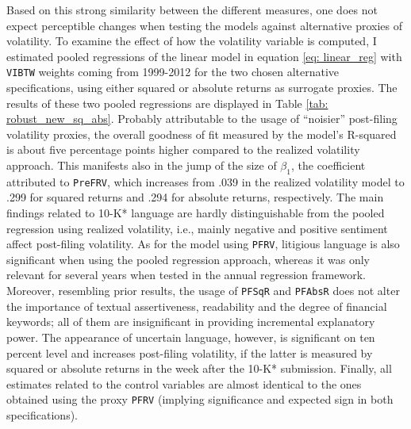 Based on this strong similarity between the different measures, one does not expect perceptible changes when testing the models against alternative proxies of volatility. To examine the effect of how the volatility variable is computed, I estimated pooled regressions of the linear model in equation \eqref{eq: linear_reg} with \texttt{VIBTW} weights coming from 1999-2012 for the two chosen alternative specifications, using either squared or absolute returns as surrogate proxies. The results of these two pooled regressions are displayed in Table \ref{tab: robust_new_sq_abs}. Probably attributable to the usage of \enquote{noisier} post-filing volatility proxies, the overall goodness of fit measured by the model's R-squared is about five percentage points higher compared to the realized volatility approach. This manifests also in the jump of the size of $\beta_1$, the coefficient attributed to \texttt{PreFRV}, which increases from .039 in the realized volatility model to .299  for squared returns and .294 for absolute returns, respectively. The main findings related to 10-K* language are hardly distinguishable from the pooled regression using realized volatility, i.e., mainly negative and positive sentiment affect post-filing volatility. As for the model using \texttt{PFRV}, litigious language is also significant when using the pooled regression approach, whereas it was only relevant for several years when tested in the annual regression framework. Moreover, resembling prior results, the usage of \texttt{PFSqR} and \texttt{PFAbsR} does not alter the importance of textual assertiveness, readability and the degree of financial keywords; all of them are insignificant in providing incremental explanatory power. The appearance of uncertain language, however, is significant on ten percent level and increases post-filing volatility, if the latter is measured by squared or absolute returns in the week after the 10-K* submission. Finally, all estimates related to the control variables are almost identical to the ones obtained using the proxy \texttt{PFRV} (implying significance and expected sign in both specifications).


